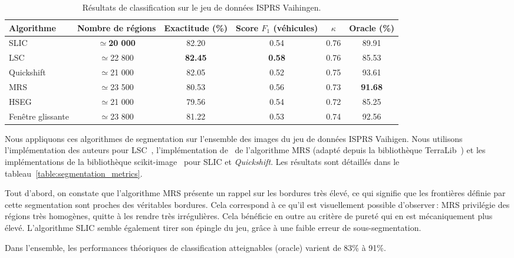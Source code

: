 \begin{table}
  \begin{tabularx}{\textwidth}{ Y c c c c c }
  \toprule
  Algorithme & Nombre de régions & Exactitude (\%) & Score $F_1$ (véhicules) & $\kappa$ & Oracle (\%)\\
	\midrule
  \gls{SLIC} & $\simeq$\textbf{20 000} & 82.20 & 0.54 & 0.76 & 89.91\\
  \gls{LSC} & $\simeq$22 800 & \textbf{82.45} & \textbf{0.58} & 0.76 & 85.53\\
  Quickshift & $\simeq$21 000 & 82.05 & 0.52 & 0.75 & 93.61\\
  \cmidrule(lr){1-5}
  \gls{MRS} & $\simeq$23 500 & 80.53 & 0.56 & 0.73 & \textbf{91.68}\\
  \gls{HSEG} & $\simeq$21 000 & 79.56 & 0.54 & 0.72 & 85.25\\
  \cmidrule(lr){1-5}
  Fenêtre glissante & $\simeq$23 800 & 81.22 & 0.53 & 0.74 & 92.56\\
  \bottomrule
  \end{tabularx}
  \caption{Résultats de classification sur le jeu de données \gls{ISPRS} Vaihingen.}
  \label{table:classification_metrics}
\end{table}

Nous appliquons ces algorithmes de segmentation sur l'ensemble des images du jeu de données \gls{ISPRS} Vaihigen. Nous utilisons l'implémentation des auteurs pour \gls{LSC}~\cite{li_superpixel_2015}, l'implémentation de~\citet{guyet_extraction_2015} de l'algorithme \gls{MRS} (adapté depuis la bibliothèque TerraLib~\cite{camara_terralib_2008}) et les implémentations de la bibliothèque scikit-image~\cite{walt_scikit-image_2014} pour \gls{SLIC} et \emph{Quickshift}.
Les résultats sont détaillés dans le tableau~\cref{table:segmentation_metrics}.

Tout d'abord, on constate que l'algorithme \gls{MRS} présente un rappel sur les bordures très élevé, ce qui signifie que les frontières définie par cette segmentation sont proches des véritables bordures. Cela correspond à ce qu'il est visuellement possible d'observer\,: \gls{MRS} privilégie des régions très homogènes, quitte à les rendre très irrégulières. Cela bénéficie en outre au critère de pureté qui en est mécaniquement plus élevé. L'algorithme \gls{SLIC} semble également tirer son épingle du jeu, grâce à une faible erreur de sous-segmentation.

Dans l'ensemble, les performances théoriques de classification atteignables (oracle) varient de 83\% à 91\%.

